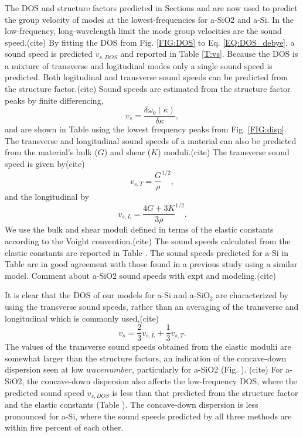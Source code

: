 \documentclass[aps,prb,onecolumn,preprint,superscriptaddress,footinbib,amsmath,amssymb,floatfix]{revtex4}
\begin{document}
The DOS and structure factors predicted in Sections and are now used to 
predict the group velocity of modes at the lowest-frequencies for 
a-SiO2 and a-Si. In the low-frequency, long-wavelength limit the 
mode group velocities are the sound speed.(cite) 
By fitting the DOS 
from Fig. \ref{FIG:DOS} to Eq. \eqref{EQ:DOS_debye}, 
a sound speed is predicted $v_{s,DOS}$ and 
reported in Table \ref{T:vs}. Because the DOS is a mixture of 
transverse and logitudinal modes only a single sound speed is predicted. 
Both logitudinal and transverse sound speeds can be predicted from 
the structure factor.(cite) 
Sound speeds are estimated from the structure factor peaks by finite 
differencing,\begin{equation}\label{EQ:vs_dwdk}
v_{s} = \frac{ \delta \omega_0(\kappa)}{\delta \kappa},
\end{equation}
and are shown in Table using the lowest frequency peaks 
from Fig. \ref{FIG:disp}. 
The transverse and longitudinal sound speeds of a material can 
also be predicted from the material's bulk ($G$) and 
shear ($K$) moduli.(cite) The transverse sound speed is given by(cite)  
\begin{equation}\label{EQ:vs_T_elas}
v_{s,T} = \frac{G}{\rho}^{1/2},
\end{equation}
and the longitudinal by
\begin{equation}\label{EQ:vs_L_elas}
v_{s,L} = \frac{4G + 3K}{3\rho}^{1/2}.
\end{equation}
We use the bulk and shear moduli defined in terms of the elastic 
constants according to the Voight convention.(cite) 
The sound speeds calculated from the 
elastic constants are reported in Table . 
The sound speeds predicted for a-Si in Table are in good agreement 
with those found in a previous study using a similar 
model.\cite{feldman_thermal_1993,feldman_numerical_1999} 
Comment about a-SiO2 sound speeds with expt and modeling.(cite)

It is clear that the DOS of 
our models for a-Si and a-SiO$_2$ are characterized by using the 
transverse sound speeds, rather than an averaging of the transverse 
and longitudinal which is commonly used,(cite)  
\begin{equation}\label{EQ:vs_avg}
v_{s} = \frac{2}{3}v_{s,L} + \frac{1}{3}v_{s,T}. 
\end{equation} 
The values of the transverse sound speeds obtained from the 
elastic modulii are somewhat larger than the structure factors, 
an indication of the concave-down dispersion seen at low 
$wavenumber$, particularly for a-SiO2 (Fig. ).
(cite) For a-SiO2, the concave-down dispersion
also affects the low-frequency DOS, where the predicted sound speed 
$v_{s,DOS}$ is less than that predicted from the structure factor 
and the elastic constants (Table ). The concave-down dispersion 
is less pronounced for a-Si, where the sound speeds predicted 
by all three methods are within five percent of each other. 
\end{document}
